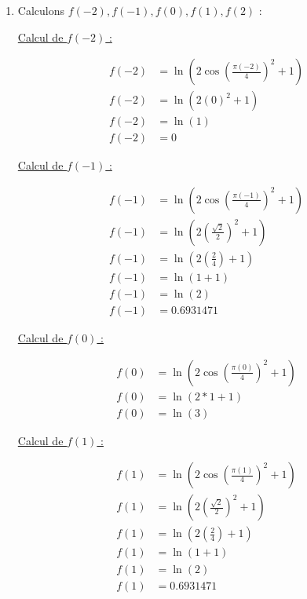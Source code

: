 \documentclass[12pt, letterpaper]{article}
\begin{document}
\begin{enumerate}
\item Calculons $f(-2), f(-1), f(0), f(1), f(2)$ :

  \underline{Calcul de $f(-2)$ :}
  
  \begin{equation*}
    \begin{split}
      f(-2) & = \ln(2\cos \left( \frac{\pi(-2)}{4} \right)^2 + 1) \\
      f(-2) & = \ln(2(0)^2 + 1) \\
      f(-2) & = \ln(1) \\
      f(-2) & = 0
    \end{split}
  \end{equation*}

  \underline{Calcul de $f(-1)$ :}
  
  \begin{equation*}
    \begin{split}
      f(-1) & = \ln(2\cos \left( \frac{\pi(-1)}{4} \right)^2 + 1) \\
      f(-1) & = \ln(2 \left( \frac{\sqrt{2}}{2} \right)^2 + 1) \\
      f(-1) & = \ln(2 \left( \frac{2}{4} \right) + 1) \\
      f(-1) & = \ln(1 + 1) \\
      f(-1) & = \ln(2) \\
      f(-1) & = 0.6931471
    \end{split}
  \end{equation*}

  \underline{Calcul de $f(0)$ :}
  
  \begin{equation*}
    \begin{split}
      f(0) & = \ln(2\cos \left( \frac{\pi(0)}{4} \right)^2 + 1) \\
      f(0) & = \ln(2 * 1 + 1) \\
      f(0) & = \ln(3)
    \end{split}
  \end{equation*}

  \underline{Calcul de $f(1)$ :}
  
  \begin{equation*}
    \begin{split}
      f(1) & = \ln(2\cos \left( \frac{\pi(1)}{4} \right)^2 + 1) \\
      f(1) & = \ln(2 \left( \frac{\sqrt{2}}{2} \right)^2 + 1) \\
      f(1) & = \ln(2 \left( \frac{2}{4} \right) + 1) \\
      f(1) & = \ln(1 + 1) \\
      f(1) & = \ln(2) \\
      f(1) & = 0.6931471
    \end{split}
  \end{equation*}


\end{enumerate}
\end{document}

